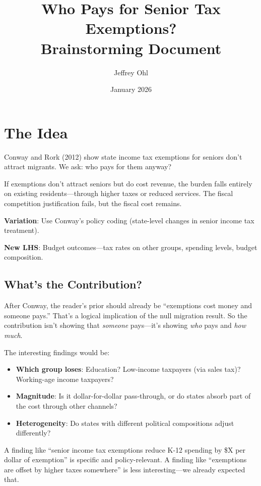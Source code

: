 \documentclass[11pt]{article}
\title{Who Pays for Senior Tax Exemptions?\\[0.5em]\large Brainstorming Document}
\author{Jeffrey Ohl}
\date{January 2026}
\begin{document}
\maketitle

\section*{The Idea}

Conway and Rork (2012) show state income tax exemptions for seniors don't attract migrants. We ask: who pays for them anyway?

If exemptions don't attract seniors but do cost revenue, the burden falls entirely on existing residents---through higher taxes or reduced services. The fiscal competition justification fails, but the fiscal cost remains.

\textbf{Variation}: Use Conway's policy coding (state-level changes in senior income tax treatment).

\textbf{New LHS}: Budget outcomes---tax rates on other groups, spending levels, budget composition.

\subsection*{What's the Contribution?}

After Conway, the reader's prior should already be ``exemptions cost money and someone pays.'' That's a logical implication of the null migration result. So the contribution isn't showing that \textit{someone} pays---it's showing \textit{who} pays and \textit{how much}.

The interesting findings would be:
\begin{itemize}
    \item \textbf{Which group loses}: Education? Low-income taxpayers (via sales tax)? Working-age income taxpayers?
    \item \textbf{Magnitude}: Is it dollar-for-dollar pass-through, or do states absorb part of the cost through other channels?
    \item \textbf{Heterogeneity}: Do states with different political compositions adjust differently?
\end{itemize}

A finding like ``senior income tax exemptions reduce K-12 spending by \$X per dollar of exemption'' is specific and policy-relevant. A finding like ``exemptions are offset by higher taxes somewhere'' is less interesting---we already expected that.
\end{document}
